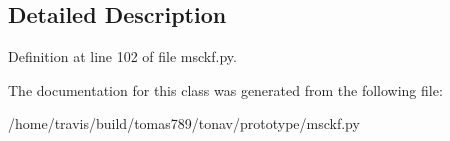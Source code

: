 \subsection{Detailed Description}


Definition at line 102 of file msckf.\-py.



The documentation for this class was generated from the following file\-:\begin{DoxyCompactItemize}
\item 
/home/travis/build/tomas789/tonav/prototype/msckf.\-py\end{DoxyCompactItemize}

